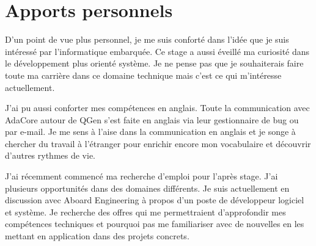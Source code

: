 \section*{Apports personnels}
D'un point de vue plus personnel, je me suis conforté dans l'idée que je suis
intéressé par l'informatique embarquée. Ce stage a aussi éveillé ma curiosité
dans le développement plus orienté système. Je ne pense pas que je souhaiterais
faire toute ma carrière dans ce domaine technique mais c'est ce qui m'intéresse
actuellement.

J'ai pu aussi conforter mes compétences en anglais. Toute la
communication avec AdaCore autour de QGen s'est faite en anglais via leur
gestionnaire de bug ou par e-mail. Je me sens à l'aise dans la communication en
anglais et je songe à chercher du travail à l'étranger pour enrichir encore mon
vocabulaire et découvrir d'autres rythmes de vie.

J'ai récemment commencé ma recherche d'emploi pour l'après stage. J'ai
plusieurs opportunités dans des domaines différents. Je suis actuellement en
discussion avec Aboard Engineering à propos d'un poste de développeur logiciel
et système. Je recherche des offres qui me permettraient d'approfondir mes
compétences techniques et pourquoi pas me familiariser avec de nouvelles en les
mettant en application dans des projets concrets.


